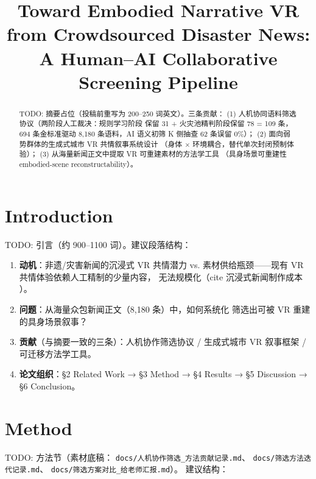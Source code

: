 \documentclass[manuscript,review,anonymous]{acmart}
\title{Toward Embodied Narrative VR from Crowdsourced Disaster News:
       A Human--AI Collaborative Screening Pipeline}
\author{}
\affiliation{}
\begin{document}
\begin{abstract}
TODO: 摘要占位（投稿前重写为 200--250 词英文）。三条贡献：
(1) 人机协同语料筛选协议（两阶段人工裁决：规则学习阶段
保留 31 + 火灾池精判阶段保留 78 = 109 条，694 条金标准驱动
8,180 条语料，AI 语义初筛 K 侧抽查 62 条误留 0\%）；
(2) 面向弱势群体的生成式城市 VR 共情叙事系统设计
（身体 $\times$ 环境耦合，替代单次封闭预制体验）；
(3) 从海量新闻正文中提取 VR 可重建素材的方法学工具
（具身场景可重建性 embodied-scene reconstructability）。
\end{abstract}


\maketitle

\section{Introduction}
\label{sec:intro}
TODO: 引言（约 900--1100 词）。建议段落结构：
\begin{enumerate}
  \item \textbf{动机}：非遗/灾害新闻的沉浸式 VR 共情潜力 vs.
        素材供给瓶颈——现有 VR 共情体验依赖人工精制的少量内容，
        无法规模化（cite 沉浸式新闻制作成本 \cite{embracing2024}）。
  \item \textbf{问题}：从海量众包新闻正文（8,180 条）中，如何系统化
        筛选出可被 VR 重建的具身场景叙事？
  \item \textbf{贡献}（与摘要一致的三条）：人机协作筛选协议 /
        生成式城市 VR 叙事框架 / 可迁移方法学工具。
  \item \textbf{论文组织}：§2 Related Work → §3 Method → §4 Results
        → §5 Discussion → §6 Conclusion。
\end{enumerate}



\section{Method}
\label{sec:method}
TODO: 方法节（素材底稿：
\texttt{docs/人机协作筛选\_方法贡献记录.md}、
\texttt{docs/筛选方法迭代记录.md}、
\texttt{docs/筛选方案对比\_给老师汇报.md}）。
建议结构：
\end{document}
